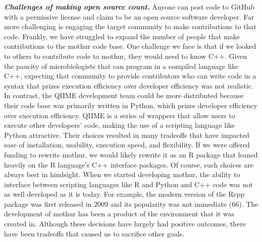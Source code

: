 \documentclass[11pt,]{article}
\begin{document}
\textbf{\emph{Challenges of making open source count.}} Anyone can post
code to GitHub with a permissive license and claim to be an open source
software developer. Far more challenging is engaging the target
community to make contributions to that code. Frankly, we have struggled
to expand the number of people that make contributions to the mothur
code base. One challenge we face is that if we looked to others to
contribute code to mothur, they would need to know C++. Given the
paucity of microbiologists that can program in a compiled language like
C++, expecting that community to provide contributors who can write code
in a syntax that prizes execution efficiency over developer efficiency
was not realistic. In contrast, the QIIME development team could be more
distributed because their code base was primarily written in Python,
which prizes developer efficiency over execution efficiency. QIIME is a
series of wrappers that allow users to execute other developers' code,
making the use of a scripting language like Python attractive. Their
choices resulted in many tradeoffs that have impacted ease of
installation, usability, execution speed, and flexibility. If we were
offered funding to rewrite mothur, we would likely rewrite it as an R
package that leaned heavily on the R language's C++ interface packages.
Of course, such choices are always best in hindsight. When we started
developing mothur, the ability to interface between scripting languages
like R and Python and C++ code was not as well developed as it is today.
For example, the modern version of the Rcpp package was first released
in 2009 and its popularity was not immediate (66). The development of
mothur has been a product of the environment that it was created in.
Although these decisions have largely had positive outcomes, there have
been tradeoffs that caused us to sacrifice other goals.
\end{document}
